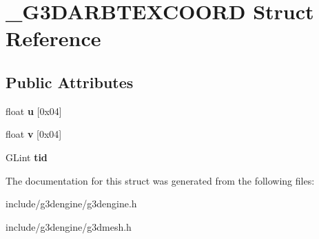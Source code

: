 \hypertarget{struct__G3DARBTEXCOORD}{}\section{\+\_\+\+G3\+D\+A\+R\+B\+T\+E\+X\+C\+O\+O\+RD Struct Reference}
\label{struct__G3DARBTEXCOORD}
\subsection*{Public Attributes}
\begin{DoxyCompactItemize}
\item 
\mbox{\label{struct__G3DARBTEXCOORD_a6f394ccc4aa84fb948a2090e81b7267d}} 
float {\bfseries u} \mbox{[}0x04\mbox{]}
\item 
\mbox{\label{struct__G3DARBTEXCOORD_a1e872e72a4ea39f98bcfc46795455670}} 
float {\bfseries v} \mbox{[}0x04\mbox{]}
\item 
\mbox{\label{struct__G3DARBTEXCOORD_a9f34e40a627f88e2e43a167f90f3c7b7}} 
G\+Lint {\bfseries tid}
\end{DoxyCompactItemize}


The documentation for this struct was generated from the following files\+:\begin{DoxyCompactItemize}
\item 
include/g3dengine/g3dengine.\+h\item 
include/g3dengine/g3dmesh.\+h\end{DoxyCompactItemize}

